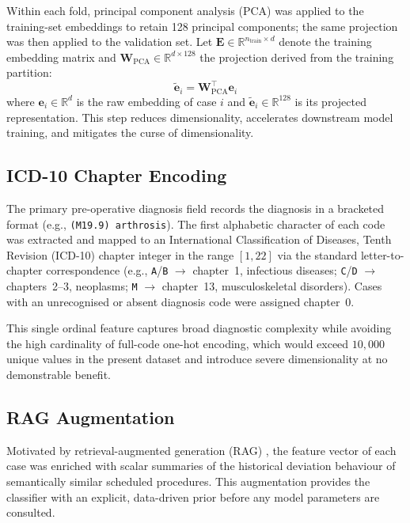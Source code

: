 Within each fold, principal component analysis (PCA) was applied to the
training-set embeddings to retain 128 principal components; the same projection
was then applied to the validation set.  Let $\mathbf{E} \in
\mathbb{R}^{n_{\mathrm{train}} \times d}$ denote the training embedding matrix
and $\mathbf{W}_{\mathrm{PCA}} \in \mathbb{R}^{d \times 128}$ the projection
derived from the training partition:
\begin{equation}
  \tilde{\mathbf{e}}_i = \mathbf{W}_{\mathrm{PCA}}^{\top} \mathbf{e}_i
  \label{eq:pca}
\end{equation}
where $\mathbf{e}_i \in \mathbb{R}^{d}$ is the raw embedding of case $i$ and
$\tilde{\mathbf{e}}_i \in \mathbb{R}^{128}$ is its projected representation.
This step reduces dimensionality, accelerates downstream model training, and
mitigates the curse of dimensionality.

\subsection{ICD-10 Chapter Encoding}
\label{sec:icd}

The primary pre-operative diagnosis field records the diagnosis in a bracketed
format (e.g., \texttt{(M19.9) arthrosis}).  The first
alphabetic character of each code was extracted and mapped to an
International Classification of Diseases, Tenth Revision (ICD-10) chapter
integer in the range $[1, 22]$ via the standard letter-to-chapter
correspondence (e.g., \texttt{A}/\texttt{B} $\to$ chapter~1, infectious
diseases; \texttt{C}/\texttt{D} $\to$ chapters~2--3, neoplasms; \texttt{M}
$\to$ chapter~13, musculoskeletal disorders).  Cases with an unrecognised or
absent diagnosis code were assigned chapter~0.

This single ordinal feature captures broad diagnostic complexity while avoiding
the high cardinality of full-code one-hot encoding, which would exceed
$10{,}000$ unique values in the present dataset and introduce severe
dimensionality at no demonstrable benefit.

\subsection{RAG Augmentation}
\label{sec:rag}

Motivated by retrieval-augmented generation (RAG) \citep{lewis2020retrieval},
the feature vector of each case was enriched with scalar summaries of the
historical deviation behaviour of semantically similar scheduled procedures.
This augmentation provides the classifier with an explicit, data-driven prior
before any model parameters are consulted.

